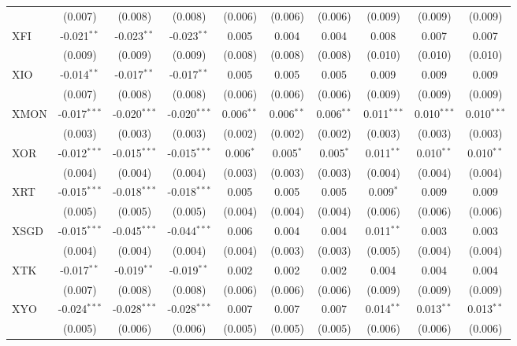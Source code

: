 \begin{table}[!htbp]
\begin{tabular}{@{\extracolsep{5pt}}lccccccccc}
  & (0.007) & (0.008) & (0.008) & (0.006) & (0.006) & (0.006) & (0.009) & (0.009) & (0.009) \\
 XFI & -0.021$^{**}$ & -0.023$^{**}$ & -0.023$^{**}$ & 0.005$^{}$ & 0.004$^{}$ & 0.004$^{}$ & 0.008$^{}$ & 0.007$^{}$ & 0.007$^{}$ \\
  & (0.009) & (0.009) & (0.009) & (0.008) & (0.008) & (0.008) & (0.010) & (0.010) & (0.010) \\
 XIO & -0.014$^{**}$ & -0.017$^{**}$ & -0.017$^{**}$ & 0.005$^{}$ & 0.005$^{}$ & 0.005$^{}$ & 0.009$^{}$ & 0.009$^{}$ & 0.009$^{}$ \\
  & (0.007) & (0.008) & (0.008) & (0.006) & (0.006) & (0.006) & (0.009) & (0.009) & (0.009) \\
 XMON & -0.017$^{***}$ & -0.020$^{***}$ & -0.020$^{***}$ & 0.006$^{**}$ & 0.006$^{**}$ & 0.006$^{**}$ & 0.011$^{***}$ & 0.010$^{***}$ & 0.010$^{***}$ \\
  & (0.003) & (0.003) & (0.003) & (0.002) & (0.002) & (0.002) & (0.003) & (0.003) & (0.003) \\
 XOR & -0.012$^{***}$ & -0.015$^{***}$ & -0.015$^{***}$ & 0.006$^{*}$ & 0.005$^{*}$ & 0.005$^{*}$ & 0.011$^{**}$ & 0.010$^{**}$ & 0.010$^{**}$ \\
  & (0.004) & (0.004) & (0.004) & (0.003) & (0.003) & (0.003) & (0.004) & (0.004) & (0.004) \\
 XRT & -0.015$^{***}$ & -0.018$^{***}$ & -0.018$^{***}$ & 0.005$^{}$ & 0.005$^{}$ & 0.005$^{}$ & 0.009$^{*}$ & 0.009$^{}$ & 0.009$^{}$ \\
  & (0.005) & (0.005) & (0.005) & (0.004) & (0.004) & (0.004) & (0.006) & (0.006) & (0.006) \\
 XSGD & -0.015$^{***}$ & -0.045$^{***}$ & -0.044$^{***}$ & 0.006$^{}$ & 0.004$^{}$ & 0.004$^{}$ & 0.011$^{**}$ & 0.003$^{}$ & 0.003$^{}$ \\
  & (0.004) & (0.004) & (0.004) & (0.004) & (0.003) & (0.003) & (0.005) & (0.004) & (0.004) \\
 XTK & -0.017$^{**}$ & -0.019$^{**}$ & -0.019$^{**}$ & 0.002$^{}$ & 0.002$^{}$ & 0.002$^{}$ & 0.004$^{}$ & 0.004$^{}$ & 0.004$^{}$ \\
  & (0.007) & (0.008) & (0.008) & (0.006) & (0.006) & (0.006) & (0.009) & (0.009) & (0.009) \\
 XYO & -0.024$^{***}$ & -0.028$^{***}$ & -0.028$^{***}$ & 0.007$^{}$ & 0.007$^{}$ & 0.007$^{}$ & 0.014$^{**}$ & 0.013$^{**}$ & 0.013$^{**}$ \\
  & (0.005) & (0.006) & (0.006) & (0.005) & (0.005) & (0.005) & (0.006) & (0.006) & (0.006) \\

\end{tabular}
\end{table}
